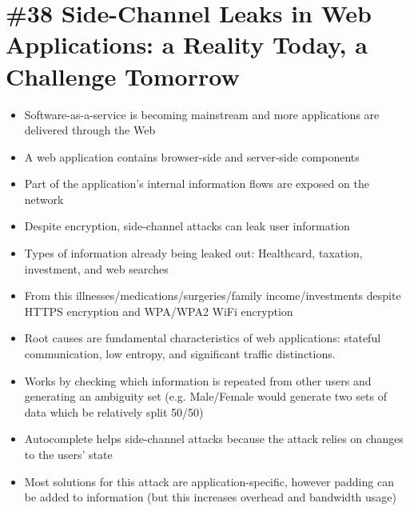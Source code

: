 \section{\#38 Side-Channel Leaks in Web Applications: a Reality Today, a Challenge Tomorrow}
\begin{itemize}
	\item Software-as-a-service is becoming mainstream and more applications are delivered through the Web
	\item A web application contains browser-side and server-side components
	\item Part of the application's internal information flows are exposed on the network
	\item Despite encryption, side-channel attacks can leak user information
	\item Types of information already being leaked out: Healthcard, taxation, investment, and web searches
	\item From this illnesses/medications/surgeries/family income/investments despite HTTPS encryption and WPA/WPA2 WiFi encryption
	\item Root causes are fundamental characteristics of web applications: stateful communication, low entropy, and significant traffic distinctions.
	\item Works by checking which information is repeated from other users and generating an ambiguity set (e.g. Male/Female would generate two sets of data which be relatively split 50/50)
	\item Autocomplete helps side-channel attacks because the attack relies on changes to the users' state
	\item Most solutions for this attack are application-specific, however padding can be added to information (but this increases overhead and bandwidth usage)
\end{itemize}